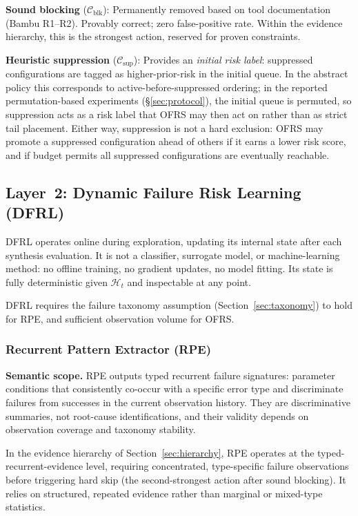 \documentclass[journal]{IEEEtran}
\begin{document}
\textbf{Sound blocking} ($\mathcal{C}_{\text{blk}}$): Permanently removed based on tool documentation (Bambu R1--R2). Provably correct; zero false-positive rate. Within the evidence hierarchy, this is the strongest action, reserved for proven constraints.

\textbf{Heuristic suppression} ($\mathcal{C}_{\text{sup}}$): Provides an \emph{initial risk label}: suppressed configurations are tagged as higher-prior-risk in the initial queue. In the abstract policy this corresponds to active-before-suppressed ordering; in the reported permutation-based experiments (\S\ref{sec:protocol}), the initial queue is permuted, so suppression acts as a risk label that OFRS may then act on rather than as strict tail placement. Either way, suppression is not a hard exclusion: OFRS may promote a suppressed configuration ahead of others if it earns a lower risk score, and if budget permits all suppressed configurations are eventually reachable.

\subsection{Layer~2: Dynamic Failure Risk Learning (DFRL)}
\label{sec:dfrl}

DFRL operates online during exploration, updating its internal state after each synthesis evaluation. It is not a classifier, surrogate model, or machine-learning method: no offline training, no gradient updates, no model fitting. Its state is fully deterministic given $\mathcal{H}_t$ and inspectable at any point.

DFRL requires the failure taxonomy assumption (Section~\ref{sec:taxonomy}) to hold for RPE, and sufficient observation volume for OFRS.

\subsubsection{Recurrent Pattern Extractor (RPE)}
\label{sec:rpe}

\textbf{Semantic scope.} RPE outputs typed recurrent failure signatures: parameter conditions that consistently co-occur with a specific error type and discriminate failures from successes in the current observation history. They are discriminative summaries, not root-cause identifications, and their validity depends on observation coverage and taxonomy stability.

In the evidence hierarchy of Section~\ref{sec:hierarchy}, RPE operates at the typed-recurrent-evidence level, requiring concentrated, type-specific failure observations before triggering hard skip (the second-strongest action after sound blocking). It relies on structured, repeated evidence rather than marginal or mixed-type statistics.
\end{document}
